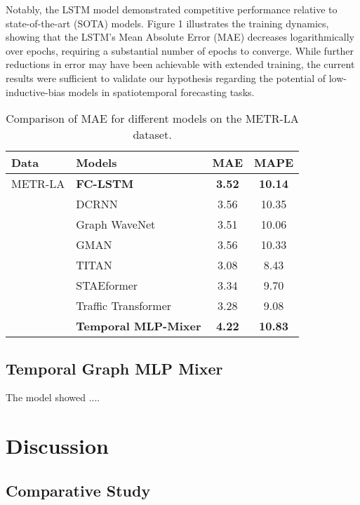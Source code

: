 \documentclass{article}
\theoremstyle{plain}
\theoremstyle{definition}
\theoremstyle{remark}
\begin{document}
Notably, the LSTM model demonstrated competitive performance relative to state-of-the-art (SOTA) models. Figure 1 illustrates the training dynamics, showing that the LSTM’s Mean Absolute Error (MAE) decreases logarithmically over epochs, requiring a substantial number of epochs to converge. While further reductions in error may have been achievable with extended training, the current results were sufficient to validate our hypothesis regarding the potential of low-inductive-bias models in spatiotemporal forecasting tasks.


\begin{table}[h!]
\centering
\begin{tabular}{@{}llcc@{}}
\toprule
\textbf{Data}    & \textbf{Models}        & \textbf{MAE} & \textbf{MAPE} \\ \midrule
METR-LA          & \textbf{FC-LSTM}      & \textbf{3.52} & \textbf{10.14} \\
                 & DCRNN                 & 3.56          & 10.35         \\
                 & Graph WaveNet         & 3.51          & 10.06         \\
                 & GMAN                  & 3.56          & 10.33         \\
                 & TITAN                 & 3.08          & 8.43          \\
                 & STAEformer            & 3.34          & 9.70          \\
                 & Traffic Transformer   & 3.28          & 9.08          \\
            & \textbf{Temporal MLP-Mixer} & \textbf{4.22}  & \textbf{10.83} \\
                 \bottomrule
\end{tabular}
\caption{Comparison of MAE for different models on the METR-LA dataset.}
\label{tab:metr_la_metrics}
\end{table}


\subsection{Temporal Graph MLP Mixer}
The model showed ....


\section{Discussion}

\subsection{Comparative Study}
\end{document}
